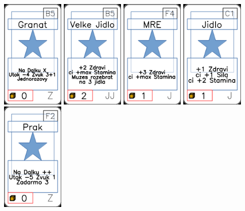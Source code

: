 \documentclass[a4paper]{article}
\begin{document}
	\includegraphics[width=3.0cm]{img-1_99}
	\includegraphics[width=3.0cm]{img-1_39}
	\includegraphics[width=3.0cm]{img-1_28}
	\includegraphics[width=3.0cm]{img-1_10}
	\includegraphics[width=3.0cm]{img-1_86}
\end{document}

